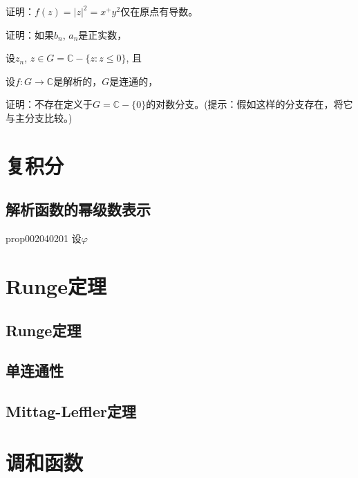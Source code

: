 \begin{problemset}
\item 证明：$f(z) = |z|^2 = x^ + y^2$仅在原点有导数。

\item\label{exer002030202}证明：如果$b_n$, $a_n$是正实数，

\item\label{exer002030209}设$z_n$, $z \in G= \mathbb{C} - \{z: z \le 0\}$, 且

\item\label{exer002030214}设$f: G \to \mathbb{C}$是解析的，$G$是连通的，

\item\label{exer002030221}证明：不存在定义于$G = \mathbb{C} - \{0\}$的对数分支。(提示：假如这样的分支存在，将它与主分支比较。)
\end{problemset}



\chapter{复积分}\label{chapter00204}

\section{解析函数的幂级数表示}\label{section0020402}

\begin{proposition}{}{prop002040201}
设$\varphi$
\end{proposition}

\chapter{Runge定理}\label{chapter00208}

\section{Runge定理}\label{section0020801}


\section{单连通性}\label{section0020802}


\section{Mittag-Leffler定理}\label{section0020803}


\chapter{调和函数}\label{chapter00210}















